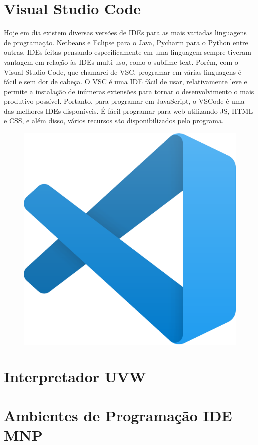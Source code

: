     \section{Visual Studio Code}
    Hoje em dia existem diversas versões de IDEs para as mais variadas linguagens de programação. Netbeans e Eclipse para o Java, Pycharm para o Python entre outras. IDEs feitas pensando especificamente em uma linguagem sempre tiveram vantagem em relação às IDEs multi-uso, como o sublime-text. Porém, com o Visual Studio Code, que chamarei de VSC, programar em várias linguagens é fácil e sem dor de cabeça. 
    O VSC é uma IDE fácil de usar, relativamente leve e permite a instalação de inúmeras extensões para tornar o desenvolvimento o mais produtivo possível.
    Portanto, para programar em JavaScript, o VSCode é uma das melhores IDEs disponíveis. É fácil programar para web utilizando JS, HTML e CSS, e além disso, vários recursos são disponibilizados pelo programa.
    
	\begin{figure}[h]
		\centering
		\includegraphics[width=0.2\linewidth]{Pictures/VSC_Logo}
		\caption{}
		\label{fig:vsclogo}
	\end{figure}


    \section{Interpretador UVW}


    \section{Ambientes de Programa\c{c}\~{a}o IDE MNP} 